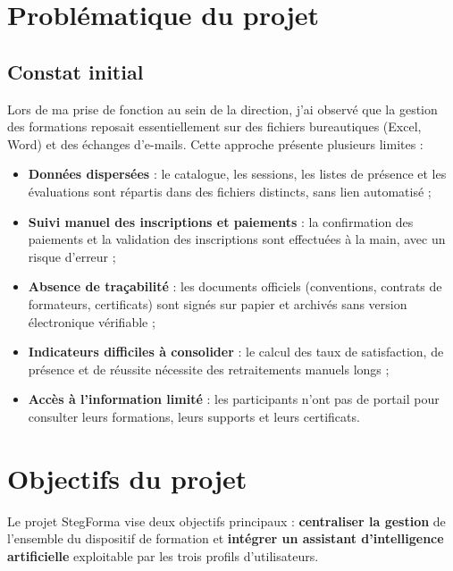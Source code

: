 \documentclass[12pt,a4paper,oneside,openany]{report}
\begin{document}
\section{Problématique du projet}

\subsection{Constat initial}

Lors de ma prise de fonction au sein de la direction, j'ai observé que la gestion des formations reposait essentiellement sur des fichiers bureautiques (Excel, Word) et des échanges d'e-mails. Cette approche présente plusieurs limites :
\begin{itemize}
    \item \textbf{Données dispersées} : le catalogue, les sessions, les listes de présence et les évaluations sont répartis dans des fichiers distincts, sans lien automatisé ;
    \item \textbf{Suivi manuel des inscriptions et paiements} : la confirmation des paiements et la validation des inscriptions sont effectuées à la main, avec un risque d'erreur ;
    \item \textbf{Absence de traçabilité} : les documents officiels (conventions, contrats de formateurs, certificats) sont signés sur papier et archivés sans version électronique vérifiable ;
    \item \textbf{Indicateurs difficiles à consolider} : le calcul des taux de satisfaction, de présence et de réussite nécessite des retraitements manuels longs ;
    \item \textbf{Accès à l'information limité} : les participants n'ont pas de portail pour consulter leurs formations, leurs supports et leurs certificats.
\end{itemize}

\section{Objectifs du projet}

Le projet StegForma vise deux objectifs principaux : \textbf{centraliser la gestion} de l'ensemble du dispositif de formation et \textbf{intégrer un assistant d'intelligence artificielle} exploitable par les trois profils d'utilisateurs.
\end{document}
